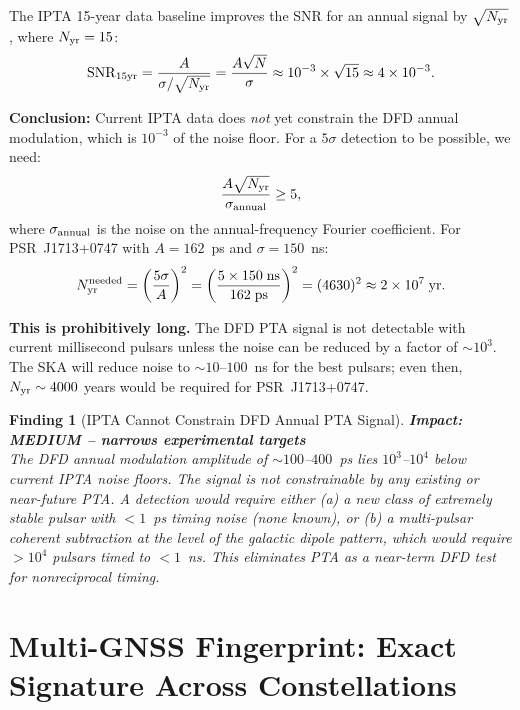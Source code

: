 \documentclass[aps,prd,twocolumn,superscriptaddress,nofootinbib]{revtex4-2}
\newtheorem{finding}{Finding}
\begin{document}
The IPTA 15-year data baseline improves the SNR for an annual signal by
$\sqrt{N_{\rm yr}}$, where $N_{\rm yr} = 15$:
\begin{equation}
{\rm SNR}_{15\rm yr} = \frac{A}{\sigma/\sqrt{N_{\rm yr}}}
= \frac{A\sqrt{N}}{\sigma}
\approx 10^{-3}\times\sqrt{15} \approx 4\times10^{-3}.
\end{equation}

\textbf{Conclusion:} Current IPTA data does \emph{not} yet constrain the DFD
annual modulation, which is $10^{-3}$ of the noise floor.
For a $5\sigma$ detection to be possible, we need:
\begin{equation}
\frac{A\sqrt{N_{\rm yr}}}{\sigma_{\rm annual}} \geq 5,
\end{equation}
where $\sigma_{\rm annual}$ is the noise on the annual-frequency Fourier
coefficient. For PSR~J1713+0747 with $A = 162$~ps and $\sigma = 150$~ns:
\begin{equation}
N_{\rm yr}^{\rm needed} = \left(\frac{5\sigma}{A}\right)^2
= \left(\frac{5\times150\;\text{ns}}{162\;\text{ps}}\right)^2
= (4630)^2 \approx 2\times10^7\;\text{yr}.
\end{equation}

\textbf{This is prohibitively long.} The DFD PTA signal is not detectable with
current millisecond pulsars unless the noise can be reduced by a factor of
$\sim 10^3$. The SKA will reduce noise to $\sim 10$--$100$~ns for the best
pulsars; even then, $N_{\rm yr} \sim 4000$ years would be required for
PSR~J1713+0747.

\begin{finding}[IPTA Cannot Constrain DFD Annual PTA Signal]
\label{find:ipta}
\textbf{Impact: MEDIUM -- narrows experimental targets}\\
The DFD annual modulation amplitude of $\sim 100$--$400$~ps lies
$10^3$--$10^4$ below current IPTA noise floors. The signal is not
constrainable by any existing or near-future PTA. A detection would
require either (a) a new class of extremely stable pulsar with $<1$~ps
timing noise (none known), or (b) a multi-pulsar coherent subtraction
at the level of the galactic dipole pattern, which would require
$> 10^4$ pulsars timed to $< 1$~ns. This eliminates PTA as a near-term
DFD test for nonreciprocal timing.
\end{finding}

\section{Multi-GNSS Fingerprint: Exact Signature Across Constellations}
\end{document}
